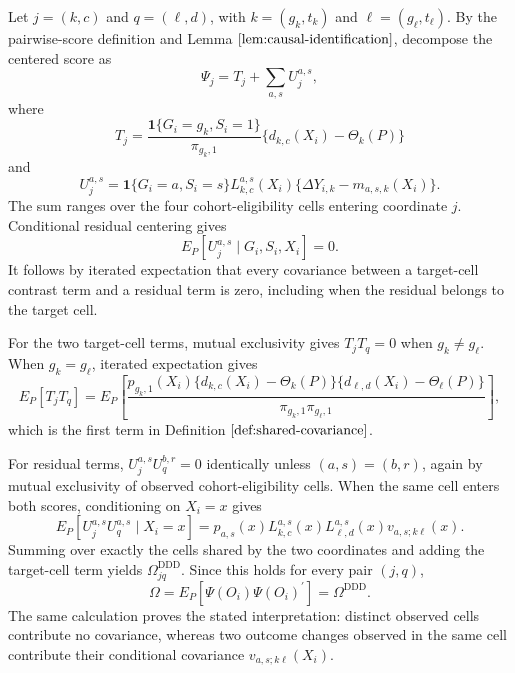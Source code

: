 Let \(j=(k,c)\) and \(q=(\ell,d)\), with \(k=(g_k,t_k)\) and \(\ell=(g_\ell,t_\ell)\). By the pairwise-score definition and Lemma \(\ref{lem:causal-identification}\), decompose the centered score as
\[
 \Psi_j=T_j+\sum_{a,s}U_j^{a,s},
\]
where
\[
 T_j=\frac{\mathbf 1\{G_i=g_k,S_i=1\}}{\pi_{g_k,1}}
       \{d_{k,c}(X_i)-\Theta_k(P)\}
\]
and
\[
 U_j^{a,s}=\mathbf 1\{G_i=a,S_i=s\}L_{k,c}^{a,s}(X_i)
       \{\Delta Y_{i,k}-m_{a,s,k}(X_i)\}.
\]
The sum ranges over the four cohort-eligibility cells entering coordinate \(j\). Conditional residual centering gives
\[
 E_P[U_j^{a,s}\mid G_i,S_i,X_i]=0.
\]
It follows by iterated expectation that every covariance between a target-cell contrast term and a residual term is zero, including when the residual belongs to the target cell.

For the two target-cell terms, mutual exclusivity gives \(T_jT_q=0\) when \(g_k\ne g_\ell\). When \(g_k=g_\ell\), iterated expectation gives
\[
 E_P[T_jT_q]
 =E_P\!\left[
 \frac{p_{g_k,1}(X_i)
 \{d_{k,c}(X_i)-\Theta_k(P)\}
 \{d_{\ell,d}(X_i)-\Theta_\ell(P)\}}
 {\pi_{g_k,1}\pi_{g_\ell,1}}
 \right],
\]
which is the first term in Definition \(\ref{def:shared-covariance}\).

For residual terms, \(U_j^{a,s}U_q^{b,r}=0\) identically unless \((a,s)=(b,r)\), again by mutual exclusivity of observed cohort-eligibility cells. When the same cell enters both scores, conditioning on \(X_i=x\) gives
\[
 E_P[U_j^{a,s}U_q^{a,s}\mid X_i=x]
 =p_{a,s}(x)L_{k,c}^{a,s}(x)L_{\ell,d}^{a,s}(x)
   v_{a,s;k\ell}(x).
\]
Summing over exactly the cells shared by the two coordinates and adding the target-cell term yields \(\Omega^{\mathrm{DDD}}_{jq}\). Since this holds for every pair \((j,q)\),
\[
 \Omega=E_P[\Psi(O_i)\Psi(O_i)^{\prime}]=\Omega^{\mathrm{DDD}}.
\]
The same calculation proves the stated interpretation: distinct observed cells contribute no covariance, whereas two outcome changes observed in the same cell contribute their conditional covariance \(v_{a,s;k\ell}(X_i)\).
